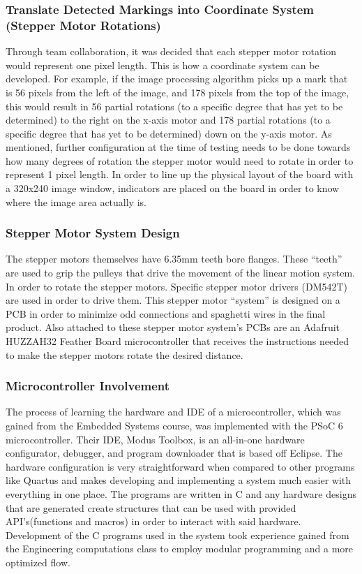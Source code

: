 \subsubsection{Translate Detected Markings into Coordinate System (Stepper Motor Rotations)}
Through team collaboration, it was decided that each stepper motor rotation would represent one pixel length. This is how a coordinate system can be developed. For example, if the image processing algorithm picks up a mark that is 56 pixels from the left of the image, and 178 pixels from the top of the image, this would result in 56 partial rotations (to a specific degree that has yet to be determined) to the right on the x-axis motor and 178 partial rotations (to a specific degree that has yet to be determined) down on the y-axis motor. As mentioned, further configuration at the time of testing needs to be done towards how many degrees of rotation the stepper motor would need to rotate in order to represent 1 pixel length. In order to line up the physical layout of the board with a 320x240 image window, indicators are placed on the board in order to know where the image area actually is.\\
\subsubsection{Stepper Motor System Design}
The stepper motors themselves have 6.35mm teeth bore flanges. These ``teeth'' are used to grip the pulleys that drive the movement of the linear motion system. In order to rotate the stepper motors. Specific stepper motor drivers (DM542T) are used in order to drive them. This stepper motor ``system'' is designed on a PCB in order to minimize odd connections and spaghetti wires in the final product. Also attached to these stepper motor system's PCBs are an Adafruit HUZZAH32 Feather Board microcontroller that receives the instructions needed to make the stepper motors rotate the desired distance.\\
\subsubsection{Microcontroller Involvement}
The process of learning the hardware and IDE of a microcontroller, which was gained from the Embedded Systems course, was implemented with the PSoC 6 microcontroller. Their IDE, Modus Toolbox, is an all-in-one hardware configurator, debugger, and program downloader that is based off Eclipse. The hardware configuration is very straightforward when compared to other programs like Quartus and makes developing and implementing a system much easier with everything in one place. The programs are written in C and any hardware designs that are generated create structures that can be used with provided API's(functions and macros) in order to interact with said hardware. Development of the C programs used in the system took experience gained from the Engineering computations class to employ modular programming and a more optimized flow. \\

